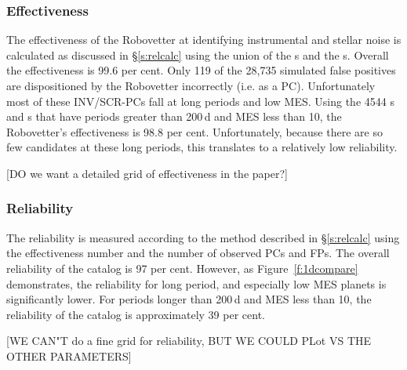 \subsubsection{Effectiveness}
The effectiveness of the Robovetter at identifying instrumental and stellar noise is calculated as discussed in \S\ref{s:relcalc} using the union of the \invtce s and the \scrtce s. Overall the effectiveness is 99.6 per cent.  Only 119 of the 28,735 simulated false positives are dispositioned by the Robovetter incorrectly (i.e. as a PC).  Unfortunately most of these INV/SCR-PCs fall at long periods and low MES.
Using the 4544 \invtce s and \scrtce s that have periods greater than 200\,d and MES less than 10, the Robovetter's effectiveness is 98.8 per cent.  Unfortunately, because there are so few candidates at these long periods, this translates to a relatively low reliability.

[DO we want a detailed grid of effectiveness in the paper?]

\subsubsection{Reliability}
\label{s:reliability}
The reliability is measured according to the method described in \S\ref{s:relcalc} using the effectiveness number and the number of observed PCs and FPs.  The overall reliability of the catalog is 97 per cent. However, as Figure~\ref{f:1dcompare} demonstrates, the reliability for long period, and especially low MES planets is significantly lower.  For periods longer than 200\,d and MES less than 10, the reliability of the catalog is approximately 39 per cent.

[WE CAN"T do a fine grid for reliability, BUT WE COULD PLot VS THE  OTHER PARAMETERS]

